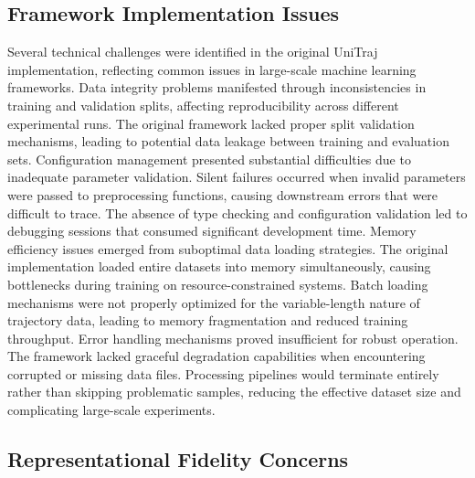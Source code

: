\subsection{Framework Implementation Issues}
\label{ssec:implementation_issues}

Several technical challenges were identified in the original UniTraj implementation, reflecting common issues in large-scale machine learning frameworks. Data integrity problems manifested through inconsistencies in training and validation splits, affecting reproducibility across different experimental runs. The original framework lacked proper split validation mechanisms, leading to potential data leakage between training and evaluation sets.
Configuration management presented substantial difficulties due to inadequate parameter validation. Silent failures occurred when invalid parameters were passed to preprocessing functions, causing downstream errors that were difficult to trace. The absence of type checking and configuration validation led to debugging sessions that consumed significant development time.
Memory efficiency issues emerged from suboptimal data loading strategies. The original implementation loaded entire datasets into memory simultaneously, causing bottlenecks during training on resource-constrained systems. Batch loading mechanisms were not properly optimized for the variable-length nature of trajectory data, leading to memory fragmentation and reduced training throughput.
Error handling mechanisms proved insufficient for robust operation. The framework lacked graceful degradation capabilities when encountering corrupted or missing data files. Processing pipelines would terminate entirely rather than skipping problematic samples, reducing the effective dataset size and complicating large-scale experiments.

\subsection{Representational Fidelity Concerns}
\label{ssec:representational_fidelity}

